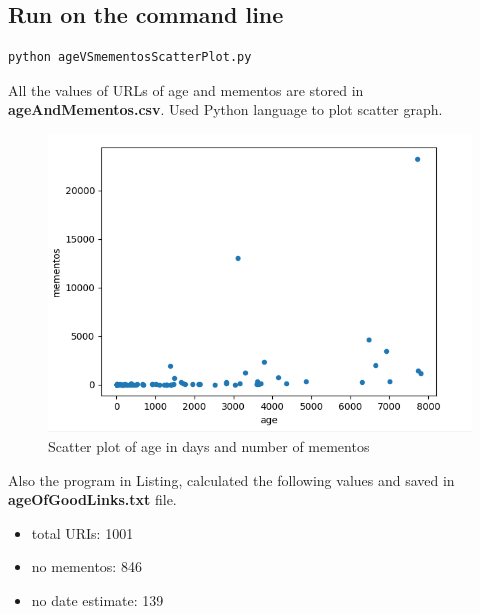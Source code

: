 \documentclass[letterpaper,11pt]{article}
\begin{document}
 \subsection*{Run on the command line}
\begin{lstlisting}[frame=single]
python ageVSmementosScatterPlot.py
\end{lstlisting}
All the values of URLs of age and mementos are stored in  \textbf{ageAndMementos.csv}. Used Python language to plot scatter graph.

\begin{figure}[h]
\includegraphics[scale=1.0]{ageVSmemntosScatterPlotGraph.png}
\caption{Scatter plot of age in days and number of mementos}
\label{fig:scatterplot}
\end{figure}
Also the program in Listing,  calculated the following values and saved in \textbf{ageOfGoodLinks.txt} file.
\begin{itemize}
  \item total URIs:	     1001
  \item no mementos:      846
  \item no date estimate: 139
\end{itemize}
\end{document}
